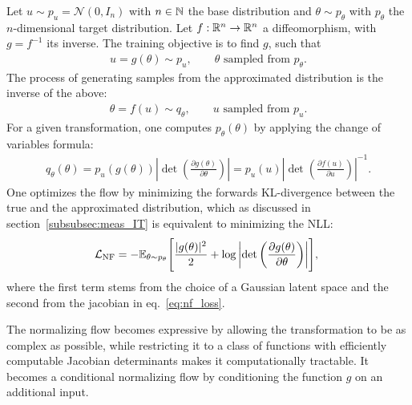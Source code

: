 Let $u \sim p_u = \mathcal{N}(0, I_n)$ with $n \in \mathbb{N}$ the base distribution and $\theta \sim p_\theta$ with $p_\theta$ the $n$-dimensional target distribution. Let $f: \mathbb{R}^n \to \mathbb{R}^n$ a diffeomorphism, with $g = f^{-1}$ its inverse. The training objective is to find $g$, such that
\begin{align}
    u = g(\theta) \sim p_u, \qquad \theta \text{ sampled from } p_\theta.
\end{align}
The process of generating samples from the approximated distribution is the inverse of the above:
\begin{align}
\theta = f(u) \sim q_\theta, \qquad u \text{ sampled from } p_u.
\end{align}
For a given transformation, one computes $p_\theta(\theta)$ by applying the change of variables formula:
\begin{align}
q_\theta(\theta) = p_u(g(\theta)) \left| \det \left( \frac{\partial g(\theta)}{\partial \theta} \right) \right| = p_u(u) \left| \det \left( \frac{\partial f(u)}{\partial u} \right) \right|^{-1}.
\end{align}
One optimizes the flow by minimizing the forwards KL-divergence between the true and the approximated distribution, which as discussed in section~\ref{subsubsec:meas_IT} is equivalent to minimizing the NLL:
\begin{align}
    \mathcal{L}_{\text{NF}} = - \mathbb{E}_{\theta \sim p_\theta} \Biggl[ \frac{|g(\theta)|^2}{2} + 
    \log \left| \det \left( \frac{\partial g(\theta)}{\partial \theta} \right) \right|\Biggr],~\label{eq:nf_loss}
\end{align}
where the first term stems from the choice of a Gaussian latent space and the second from the jacobian in eq.~\ref{eq:nf_loss}.

The normalizing flow becomes expressive by allowing the transformation to be as complex as possible, while restricting it to a class of functions with efficiently computable Jacobian determinants makes it computationally tractable. It becomes a conditional normalizing flow by conditioning the function $g$ on an additional input.